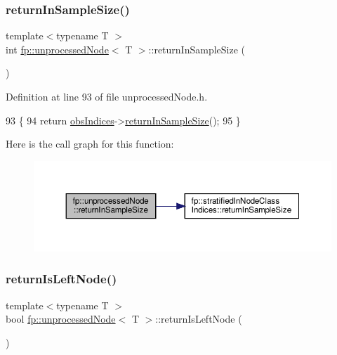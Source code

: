 \subsubsection{\texorpdfstring{return\+In\+Sample\+Size()}{returnInSampleSize()}}
{\footnotesize\ttfamily template$<$typename T $>$ \\
int \hyperlink{classfp_1_1unprocessedNode}{fp\+::unprocessed\+Node}$<$ T $>$\+::return\+In\+Sample\+Size (\begin{DoxyParamCaption}{ }\end{DoxyParamCaption})\hspace{0.3cm}{\ttfamily [inline]}}



Definition at line 93 of file unprocessed\+Node.\+h.


\begin{DoxyCode}
93                                                \{
94                     \textcolor{keywordflow}{return} \hyperlink{classfp_1_1unprocessedNode_aea171244695a3a099061188a9553e525}{obsIndices}->\hyperlink{classfp_1_1stratifiedInNodeClassIndices_a596235ffec7250fabd2818d395b39c66}{returnInSampleSize}();
95                 \}
\end{DoxyCode}
Here is the call graph for this function\+:\nopagebreak
\begin{figure}[H]
\begin{center}
\leavevmode
\includegraphics[width=350pt]{classfp_1_1unprocessedNode_a5243ac02610f01c6b0df9d5fd6f6f857_cgraph}
\end{center}
\end{figure}
\mbox{\label{classfp_1_1unprocessedNode_a0c26b122691d15592ce80875bf8920b5}} 
\subsubsection{\texorpdfstring{return\+Is\+Left\+Node()}{returnIsLeftNode()}}
{\footnotesize\ttfamily template$<$typename T $>$ \\
bool \hyperlink{classfp_1_1unprocessedNode}{fp\+::unprocessed\+Node}$<$ T $>$\+::return\+Is\+Left\+Node (\begin{DoxyParamCaption}{ }\end{DoxyParamCaption})\hspace{0.3cm}{\ttfamily [inline]}}



